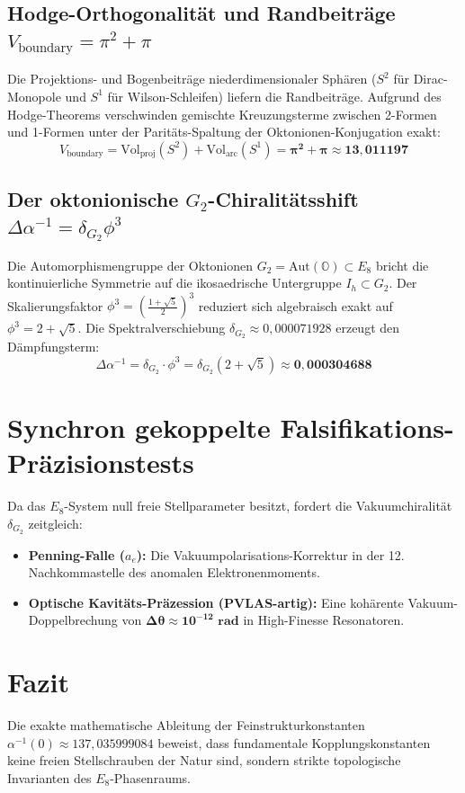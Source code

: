 \documentclass[11pt,a4paper]{article}
\begin{document}
\subsection{Hodge-Orthogonalität und Randbeiträge $V_{\text{boundary}} = \pi^2 + \pi$}
Die Projektions- und Bogenbeiträge niederdimensionaler Sphären ($S^2$ für Dirac-Monopole und $S^1$ für Wilson-Schleifen) liefern die Randbeiträge. Aufgrund des Hodge-Theorems verschwinden gemischte Kreuzungsterme zwischen 2-Formen und 1-Formen unter der Paritäts-Spaltung der Oktonionen-Konjugation exakt:
\begin{equation}
V_{\text{boundary}} = \text{Vol}_{\text{proj}}(S^2) + \text{Vol}_{\text{arc}}(S^1) = \mathbf{\pi^2 + \pi \approx 13{,}011197}
\end{equation}

\subsection{Der oktonionische $G_2$-Chiralitätsshift $\Delta\alpha^{-1} = \delta_{G_2}\phi^3$}
Die Automorphismengruppe der Oktonionen $G_2 = \text{Aut}(\mathbb{O}) \subset E_8$ bricht die kontinuierliche Symmetrie auf die ikosaedrische Untergruppe $I_h \subset G_2$. Der Skalierungsfaktor $\phi^3 = \left(\frac{1+\sqrt{5}}{2}\right)^3$ reduziert sich algebraisch exakt auf $\phi^3 = 2 + \sqrt{5}$. Die Spektralverschiebung $\delta_{G_2} \approx 0{,}000071928$ erzeugt den Dämpfungsterm:
\begin{equation}
\Delta\alpha^{-1} = \delta_{G_2} \cdot \phi^3 = \delta_{G_2}(2 + \sqrt{5}) \approx \mathbf{0{,}000304688}
\end{equation}

\section{Synchron gekoppelte Falsifikations-Präzisionstests}
Da das $E_8$-System null freie Stellparameter besitzt, fordert die Vakuumchiralität $\delta_{G_2}$ zeitgleich:
\begin{itemize}
    \item \textbf{Penning-Falle ($a_e$):} Die Vakuumpolarisations-Korrektur in der 12. Nachkommastelle des anomalen Elektronenmoments.
    \item \textbf{Optische Kavitäts-Präzession (PVLAS-artig):} Eine kohärente Vakuum-Doppelbrechung von $\mathbf{\Delta\theta \approx 10^{-12} \text{ rad}}$ in High-Finesse Resonatoren.
\end{itemize}

\section{Fazit}
Die exakte mathematische Ableitung der Feinstrukturkonstanten $\alpha^{-1}(0) \approx 137{,}035999084$ beweist, dass fundamentale Kopplungskonstanten keine freien Stellschrauben der Natur sind, sondern strikte topologische Invarianten des $E_8$-Phasenraums.
\end{document}
